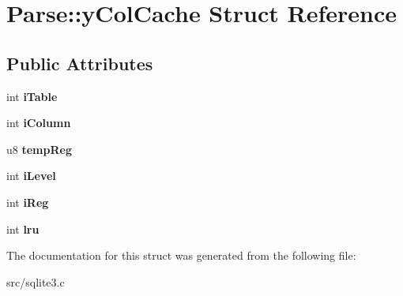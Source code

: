 \hypertarget{struct_parse_1_1y_col_cache}{\section{Parse\-:\-:y\-Col\-Cache Struct Reference}
\label{struct_parse_1_1y_col_cache}
}
\subsection*{Public Attributes}
\begin{DoxyCompactItemize}
\item 
\hypertarget{struct_parse_1_1y_col_cache_a7d99a4e00555cb0ff7fb3990bb7b549e}{int {\bfseries i\-Table}}\label{struct_parse_1_1y_col_cache_a7d99a4e00555cb0ff7fb3990bb7b549e}

\item 
\hypertarget{struct_parse_1_1y_col_cache_a67bdb189ef88aca5fc30b551da9a0f90}{int {\bfseries i\-Column}}\label{struct_parse_1_1y_col_cache_a67bdb189ef88aca5fc30b551da9a0f90}

\item 
\hypertarget{struct_parse_1_1y_col_cache_a61561cab1ce2e1914083777ae84c8fe8}{u8 {\bfseries temp\-Reg}}\label{struct_parse_1_1y_col_cache_a61561cab1ce2e1914083777ae84c8fe8}

\item 
\hypertarget{struct_parse_1_1y_col_cache_a656ea77cf538db00249221de58fd9066}{int {\bfseries i\-Level}}\label{struct_parse_1_1y_col_cache_a656ea77cf538db00249221de58fd9066}

\item 
\hypertarget{struct_parse_1_1y_col_cache_aadb47e545234142bd1e9ca4803953ab0}{int {\bfseries i\-Reg}}\label{struct_parse_1_1y_col_cache_aadb47e545234142bd1e9ca4803953ab0}

\item 
\hypertarget{struct_parse_1_1y_col_cache_ac163bb2b692f3037054f92294322f999}{int {\bfseries lru}}\label{struct_parse_1_1y_col_cache_ac163bb2b692f3037054f92294322f999}

\end{DoxyCompactItemize}


The documentation for this struct was generated from the following file\-:\begin{DoxyCompactItemize}
\item 
src/sqlite3.\-c\end{DoxyCompactItemize}
